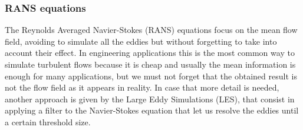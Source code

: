\subsubsection{RANS equations}
The Reynolds Averaged Navier-Stokes (RANS) equations focus on the mean flow 
field, avoiding to simulate all the eddies but without forgetting to take into 
account their effect. In engineering applications this is the most common way 
to simulate turbulent flows because it is cheap and usually the mean 
information is enough for many applications, but we must not forget that 
the obtained result is not the flow field as it appears in reality.
In case that more detail is needed, another approach is given by the Large 
Eddy Simulations (LES), that consist in applying a filter to the Navier-Stokes 
equation that let us resolve the eddies until a certain threshold size.

